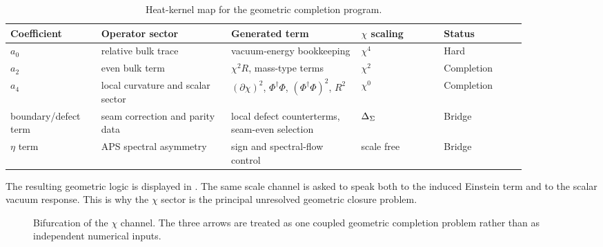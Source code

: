 \begin{table}[t]
\centering
\small
\begin{tabularx}{\linewidth}{@{}>{\raggedright\arraybackslash}p{0.15\linewidth}>{\raggedright\arraybackslash}p{0.22\linewidth}>{\raggedright\arraybackslash}p{0.22\linewidth}>{\raggedright\arraybackslash}p{0.14\linewidth}>{\raggedright\arraybackslash}p{0.14\linewidth}@{}}
\toprule
Coefficient & Operator sector & Generated term & $\chi$ scaling & Status \\
\midrule
$a_0$ & relative bulk trace & vacuum-energy bookkeeping & $\chi^4$ & Hard \\
$a_2$ & even bulk term & $\chi^2R$, mass-type terms & $\chi^2$ & Completion \\
$a_4$ & local curvature and scalar sector & $(\partial\chi)^2$, $\Phi^\dagger\Phi$, $(\Phi^\dagger\Phi)^2$, $R^2$ & $\chi^0$ & Completion \\
boundary/defect term & seam correction and parity data & local defect counterterms, seam-even selection & $\Delta_{\Sigma}$ & Bridge \\
$\eta$ term & APS spectral asymmetry & sign and spectral-flow control & scale free & Bridge \\
\bottomrule
\end{tabularx}
\caption{Heat-kernel map for the geometric completion program.}
\label{tab:heat-kernel-map}
\end{table}

The resulting geometric logic is displayed in . The same scale channel is asked to speak both to the induced Einstein term and to the scalar vacuum response. This is why the $\chi$ sector is the principal unresolved geometric closure problem.

\begin{figure}[t]
\centering
{}
\caption{Bifurcation of the $\chi$ channel. The three arrows are treated as one coupled geometric completion problem rather than as independent numerical inputs.}
\label{fig:chi-bifurcation}
\end{figure}

